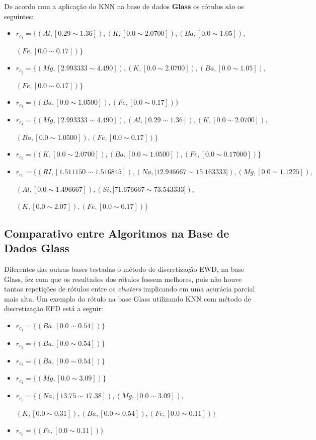 De acordo com a aplicação do KNN na base de dados \textbf{Glass} os rótulos são os seguintes:
\begin{itemize}[noitemsep]
 \item ${r_{c_1}=\{(Al,[ 0.29 \sim 1.36 ] ),(K,[ 0.0 \sim  2.0700 ] ), (Ba,[ 0.0 \sim 1.05 ] ),}$
 
 ${ (Fe,[ 0.0 \sim 0.17] )  \} }$
 \item ${r_{c_2}=\{(Mg, [ 2.993333 \sim  4.490]),(K,[ 0.0 \sim  2.0700 ] ), (Ba,[ 0.0 \sim 1.05 ] ),}$
 
 ${ (Fe,[ 0.0 \sim 0.17] )  \} }$
 \item ${r_{c_3}=\{ (Ba,[ 0.0 \sim 1.0500 ] ),(Fe,[ 0.0 \sim 0.17] )  \} }$
 \item ${r_{c_4}=\{(Mg, [ 2.993333 \sim  4.490]), (Al,[ 0.29 \sim 1.36 ] ),(K,[ 0.0 \sim  2.0700 ] ),}$
 
 ${ (Ba,[ 0.0 \sim 1.0500 ] ), (Fe,[ 0.0 \sim 0.17] )  \} }$
 \item ${r_{c_5}=\{ (K,[ 0.0 \sim  2.0700 ] ), (Ba,[ 0.0 \sim 1.0500 ] ), (Fe,[ 0.0 \sim 0.17000] ) \} }$
 \item ${r_{c_6}=\{ (RI,[ 1.511150 \sim  1.516845  ] ),(Na,]12.946667 \sim 15.163333 ] ),  (Mg,[ 0.0 \sim  1.1225  ] ), }$
 
 ${ (Al,[0.0 \sim  1.496667 ] ), (Si,] 71.676667 \sim  73.543333 ] ),  }$
 
 ${ (K,[ 0.0 \sim 2.07] ),(Fe,[ 0.0 \sim 0.17 ] ) \} }$
\end{itemize}


\subsection{Comparativo entre Algoritmos na Base de Dados Glass} \label{cap:resultados:ssec:compalgoritmos:glass}

Diferentes das outras bases testadas o método de discretização EWD, na base Glass, fez com que os resultados dos rótulos fossem melhores, pois não houve tantas repetições de rótulos entre os \textit{clusters} implicando em uma acurácia parcial mais alta. Um exemplo do rótulo na base Glass utilizando KNN com método de discretização EFD está a seguir:
\begin{itemize}[noitemsep]
 \item ${r_{c_1}=\{ (Ba,[ 0.0 \sim 0.54 ] )\} }$
 \item ${r_{c_2}=\{(Ba,[ 0.0 \sim 0.54 ] ) \} }$
 \item ${r_{c_3}=\{ (Ba,[ 0.0 \sim 0.54 ])  \} }$  
 \item ${r_{c_4}=\{ (Mg,[ 0.0 \sim 3.09 ] ) \}}$
 \item ${r_{c_5}=\{ (Na,[13.75 \sim  17.38 ] ), (Mg,[ 0.0 \sim 3.09 ] ), }$
 
 ${(K,[ 0.0 \sim 0.31 ] ), (Ba,[ 0.0 \sim 0.54 ] ), (Fe,[ 0.0 \sim 0.11] ) \} }$
 \item ${r_{c_6}=\{ (Fe,[ 0.0 \sim 0.11] ) \} }$
\end{itemize}

